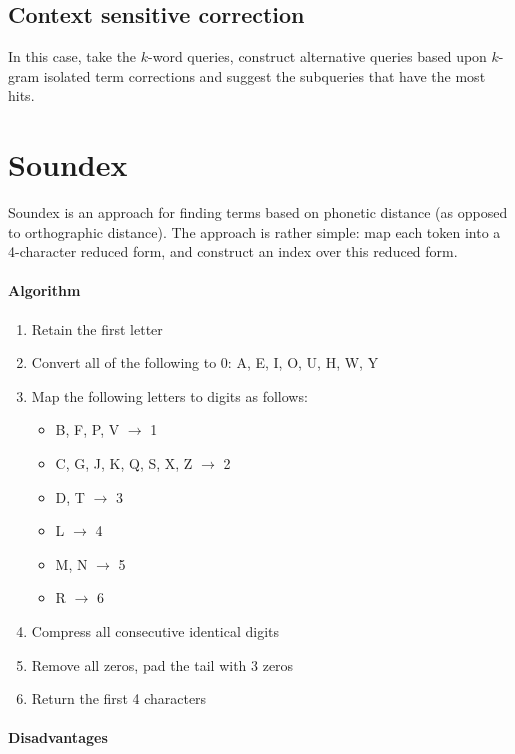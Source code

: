 \documentclass{idc_msc}
\begin{document}
\subsection{Context sensitive correction}

In this case, take the \(k\)-word queries, construct alternative queries based upon \(k\)-gram isolated term corrections and suggest the subqueries that have the most hits.


\section{Soundex}

Soundex is an approach for finding terms based on phonetic distance (as opposed to orthographic distance).
The approach is rather simple: map each token into a 4-character reduced form, and construct an index over this reduced form.

\paragraph{Algorithm}

\begin{enumerate}
  \item Retain the first letter
  \item Convert all of the following to 0: A, E, I, O, U, H, W, Y
  \item Map the following letters to digits as follows:
  \begin{itemize}
    \item B, F, P, V \(\to\) 1
    \item C, G, J, K, Q, S, X, Z \(\to\) 2
    \item D, T \(\to\) 3
    \item L \(\to\) 4
    \item M, N \(\to\) 5
    \item R \(\to\) 6
  \end{itemize}
  \item Compress all consecutive identical digits
  \item Remove all zeros, pad the tail with 3 zeros
  \item Return the first 4 characters
\end{enumerate}

\paragraph{Disadvantages}
\end{document}
